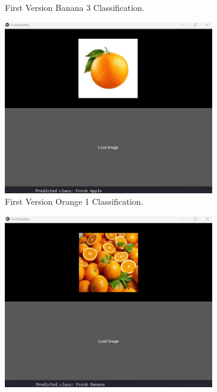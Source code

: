 \documentclass[conference]{IEEEtran}
\begin{document}
\begin{figure}[h]
\begin{subfigure}[b]{0.48\linewidth}
        \caption{First Version Banana 3 Classification.}
        \label{figFB}
    \end{subfigure}
    \hfill
    \begin{subfigure}[b]{0.48\linewidth}
        \centering
        \includegraphics[width=\linewidth]{1layer orage1.png}
        \caption{First Version Orange 1 Classification.}
        \label{figFA}
    \end{subfigure}
    \hfill
    \begin{subfigure}[b]{0.48\linewidth}
        \centering
        \includegraphics[width=\linewidth]{1layer orage2.png}

\end{subfigure}
\end{figure}
\end{document}
